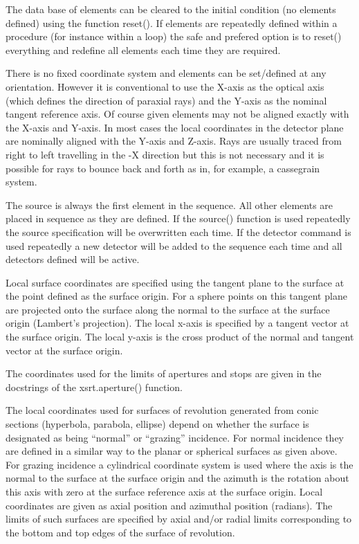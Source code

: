 \documentclass[letterpaper,10pt,english]{sphinxmanual}
\begin{document}
The data base of elements can be cleared to the initial condition (no
elements defined) using the function reset(). If elements are
repeatedly defined within a procedure (for instance within a loop)
the safe and prefered option is to reset()
everything and redefine all elements each time they are required.


There is no fixed coordinate system and elements can be set/defined at
any orientation. However it is conventional to use the X-axis as the
optical axis (which defines the direction of paraxial rays) and the
Y-axis as the nominal tangent reference axis. Of course given elements
may not be aligned exactly with the X-axis and Y-axis.
In most cases the local coordinates in the detector plane are nominally
aligned with the Y-axis and Z-axis. Rays are usually traced from right
to left travelling in the -X direction but this is not necessary and
it is possible for rays to bounce back and forth as in, for example,
a cassegrain system.

The source is always the first element in the sequence. All other
elements are placed in sequence as they are defined. If the source()
function is used repeatedly the source specification will be overwritten
each time.
If the detector command is used repeatedly a new detector will be
added to the sequence each time and all detectors defined will be active.

Local surface coordinates
are specified using the tangent plane
to the surface at the point defined as the surface origin. For a sphere
points on this tangent plane are projected
onto the surface along the normal to the surface at the surface
origin (Lambert’s projection). The local x-axis is specified by a tangent vector
at the surface origin. The local y-axis is the cross product of the
normal and tangent vector at the surface origin.

The coordinates used for the limits of apertures and stops are given
in the docstrings of the xsrt.aperture() function.

The local coordinates used for surfaces of revolution generated from conic
sections (hyperbola, parabola, ellipse) depend on whether the surface
is designated as being “normal” or “grazing” incidence. For normal
incidence they are defined in a similar way to the planar or spherical
surfaces as given above. For grazing incidence a cylindrical coordinate
system is used where the axis is the normal to the surface at
the surface origin and the azimuth is the rotation about this axis
with zero at the surface reference axis at the surface origin. Local
coordinates are given as axial position and azimuthal position (radians).
The limits of such surfaces are specified by axial and/or radial limits
corresponding to the bottom and top edges of the surface of revolution.
\end{document}
